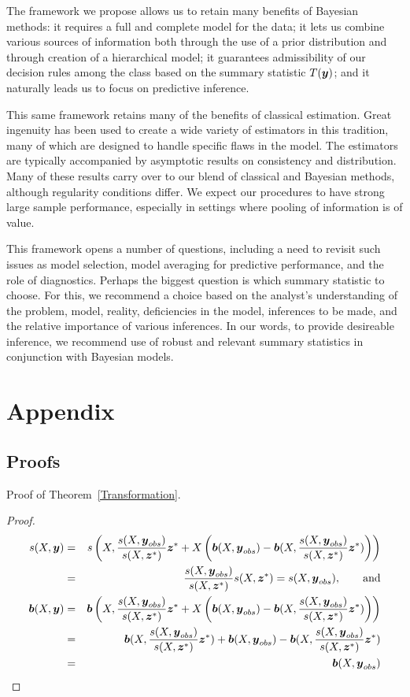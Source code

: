 \documentclass[ba]{imsart}
\newcommand{\by}{\mbox{\boldmath $y$}}
\newcommand{\bz}{\mbox{\boldmath $z$}}
\newcommand{\bb}{\mbox{\boldmath $b$}}
\newcommand{\green}[1]{{\color{green}#1}}
\begin{document}
The framework we propose allows us to retain many benefits of Bayesian methods:  it requires a full and complete model for the data; it lets us combine various sources of information both through the use of a prior distribution and through creation of a hierarchical model; it guarantees admissibility of our decision rules among the class based on the summary statistic $T(\by)$; and it naturally leads us to focus on predictive inference.   

This same framework retains many of the benefits of classical estimation.  Great ingenuity has been used to create a wide variety of estimators in this tradition, many of which are designed to handle specific flaws in the model.  The estimators are typically accompanied by asymptotic results on consistency and distribution.  Many of these results carry over to our blend of classical and Bayesian methods, although regularity conditions differ.  We expect our procedures to have strong large sample performance, especially in settings where
pooling of information is of value.  

This framework opens a number of questions, including a need to revisit such issues as model selection, model averaging for predictive performance, and the role of diagnostics.  Perhaps the biggest question is which summary statistic to choose.  For this, we recommend a choice based on the analyst's understanding of the problem, model, reality, deficiencies in the model,  inferences to be made, and the relative importance of various inferences.  \green{In our words, to provide desireable inference, we recommend use of robust and relevant summary statistics in conjunction with Bayesian models.}  


\section{Appendix}
\label{sec:appendix}
\subsection{Proofs}
\noindent

Proof of Theorem~\ref{Transformation}.  
\begin{proof} 
\begin{eqnarray}
 s(X,\by) & = & s\left(X,\frac{s(X,\by_{obs})}{s(X,\bz^*)}\bz^* + X\left(\bb(X,\by_{obs}) - \bb(X,\frac{s(X,\by_{obs})}{s(X,\bz^*)}\bz^*)\right)\right) \\
& = & \frac{s(X,\by_{obs})}{s(X,\bz^*)} s(X, \bz^*)= s(X,\by_{obs}) , \qquad \mbox{and} \\
 \bb(X,\by) & = & \bb\left(X,\frac{s(X,\by_{obs})}{s(X,\bz^*)}\bz^* + X\left(\bb(X,\by_{obs}) - \bb(X,\frac{s(X,\by_{obs})}{s(X,\bz^*)}\bz^*)\right)\right) \\
 & = & \bb(X,\frac{s(X,\by_{obs})}{s(X,\bz^*)}\bz^*) + \bb(X,\by_{obs}) - \bb(X,\frac{s(X,\by_{obs})}{s(X,\bz^*)}\bz^*) \\ &=& \bb(X,\by_{obs})
\end{eqnarray}
\end{proof}
\end{document}
